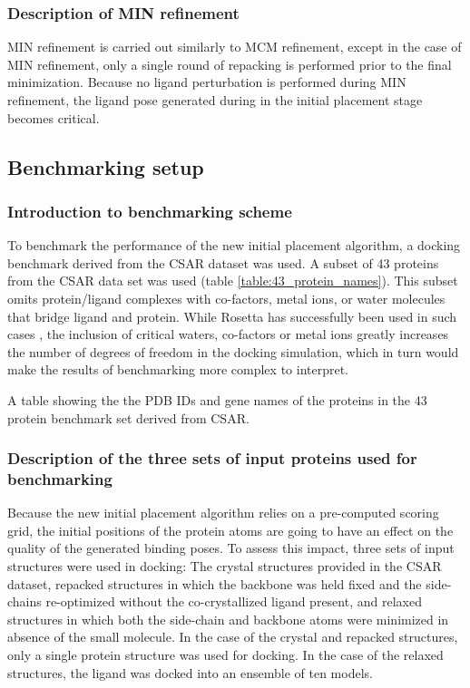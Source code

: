 \subsubsection{Description of \acs{MIN} refinement}
\ac{MIN} refinement is carried out similarly to \ac{MCM} refinement, except in the case of \ac{MIN} refinement, only a single round of repacking is performed prior to the final minimization.
Because no ligand perturbation is performed during \ac{MIN} refinement, the ligand pose generated during in the initial placement stage becomes critical.

\subsection{Benchmarking setup}
\subsubsection{Introduction to benchmarking scheme}
To benchmark the performance of the new initial placement algorithm, a docking benchmark derived from the \ac{CSAR} \citep{DunbarJr:2011kq} dataset was used.
A subset of 43 proteins from the \ac{CSAR} data set was used (table \ref{table:43_protein_names}). 
This subset omits protein/ligand complexes with co-factors, metal ions, or water molecules that bridge ligand and protein.
While Rosetta has successfully been used in such cases \citep{Lemmon:2013jd},  the inclusion of critical waters, co-factors or metal ions greatly increases the number of degrees of freedom in the docking simulation, which in turn would make the results of benchmarking more complex to interpret.
 
\begin{table}
\scriptsize
\renewcommand{\tabcolsep}{0.09cm}
\centering

\caption{A table showing the the \acs{PDB} IDs and gene names of the proteins in the 43 protein benchmark set derived from \acs{CSAR}. }
\label{table:43_protein_names}
\end{table}
 
\subsubsection{Description of the three sets of input proteins used for benchmarking}
Because the new initial placement algorithm relies on a pre-computed scoring grid, the initial positions of the protein atoms are going to have an effect on the quality of the generated binding poses.
To assess this impact, three sets of input structures were used in docking: The crystal structures provided in the \ac{CSAR} dataset, repacked structures in which the backbone was held fixed and the side-chains re-optimized without the co-crystallized ligand present, and relaxed structures in which both the side-chain and backbone atoms were minimized in absence of the small molecule.
In the case of the crystal and repacked structures, only a single protein structure was used for docking. In the case of the relaxed structures, the ligand was docked into an ensemble of ten models. 

